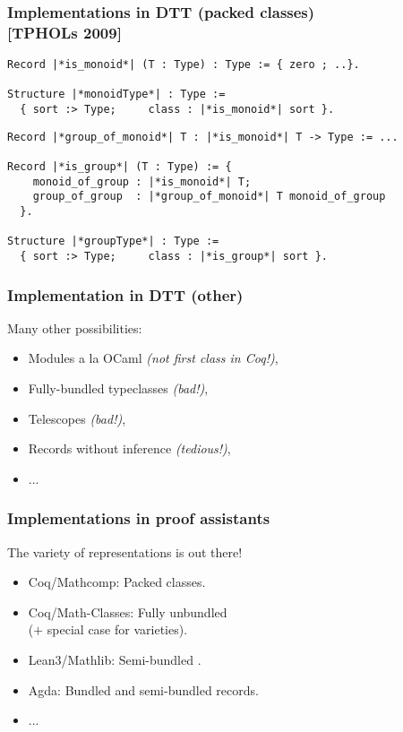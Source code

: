 \documentclass[11pt]{beamer}
\begin{document}
\begin{frame}[fragile]
  \frametitle{Implementations in DTT (packed classes) \\ \hfill [TPHOLs
    2009]}

\begin{lstlisting}
Record |*is_monoid*| (T : Type) : Type := { zero ; ..}.

Structure |*monoidType*| : Type :=
  { sort :> Type;     class : |*is_monoid*| sort }.
\end{lstlisting}


\begin{lstlisting}
Record |*group_of_monoid*| T : |*is_monoid*| T -> Type := ...

Record |*is_group*| (T : Type) := {
    monoid_of_group : |*is_monoid*| T;
    group_of_group  : |*group_of_monoid*| T monoid_of_group
  }.

Structure |*groupType*| : Type :=
  { sort :> Type;     class : |*is_group*| sort }.
\end{lstlisting}

\end{frame}

\begin{frame}
  \frametitle{Implementation in DTT (other)}

  Many other possibilities:
  \vfill
  \begin{itemize}
  \item Modules a la {\sc OCaml} \emph{(not first class in {\sc Coq}!)},
  \vfill
  \item Fully-bundled typeclasses \emph{(bad!)},
  \vfill
  \item Telescopes \emph{(bad!)},
  \vfill
  \item Records without inference \emph{(tedious!)},
  \vfill
  \item ...
  \end{itemize}

\end{frame}

\begin{frame}
  \frametitle{Implementations in proof assistants}

  The variety of representations is out there!

  \begin{itemize}
  \item {\sc Coq/Mathcomp}:     Packed classes.
\item {\sc Coq/Math-Classes}: Fully unbundled  \\
    \hfill ($+$ special case for varieties).
  \item {\sc Lean3/Mathlib}:     Semi-bundled .
  \item {\sc Agda}:             Bundled and semi-bundled records.
  \item ...
  \end{itemize}
  \vfill
  \pause

  \vfill
  \pause


\end{frame}
\end{document}
